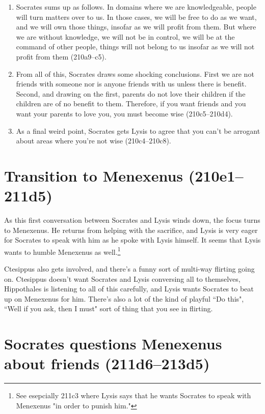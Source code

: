 \documentclass[11pt]{article}
\begin{document}
\begin{enumerate}
    \item Socrates sums up as follows.  In domains where we are knowledgeable, people will turn matters over to us.  In those cases, we will be free to do as we want, and we will own those things, insofar as we will profit from them.  But where we are without knowledge, we will not be in control, we will be at the command of other people, things will not belong to us insofar as we will not profit from them (210a9--c5).
    \item From all of this, Socrates draws some shocking conclusions.  First we are not friends with someone nor is anyone friends with us unless there is benefit.  Second, and drawing on the first, parents do not love their children if the children are of no benefit to them.  Therefore, if you want friends and you want your parents to love you, you must become wise (210c5--210d4).
    \item As a final weird point, Socrates gets Lysis to agree that you can't be arrogant about areas where you're not wise (210c4--210c8).
\end{enumerate}

\section{Transition to Menexenus (210e1--211d5)}

As this first conversation between Socrates and Lysis winds down, the focus turns to Menexenus.  He returns from helping with the sacrifice, and Lysis is very eager for Socrates to speak with him as he spoke with Lysis himself.  It seems that Lysis wants to humble Menexenus as well.\footnote{See esepcially 211c3 where Lysis says that he wants Socrates to speak with Menexenus "in order to punish him."}

Ctesippus also gets involved, and there's a funny sort of multi-way flirting going on.  Ctesippus doesn't want Socrates and Lysis conversing all to themselves, Hippothales is listening to all of this carefully, and Lysis wants Socrates to beat up on Menexenus for him.  There's also a lot of the kind of playful ``Do this", ``Well if you ask, then I must" sort of thing that you see in flirting.

\section{Socrates questions Menexenus about friends (211d6--213d5)}
\end{document}
